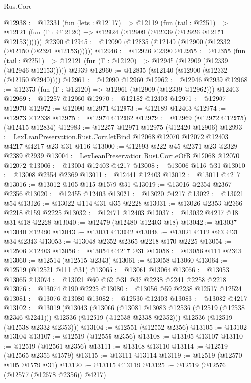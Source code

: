 \begin{lexlean}{RustCore}
\begin{coremodule}
@12938 := @12331
    (fun (lets : @12117) =>
    @12119
      (fun (tail : @2251) =>
      @12121 (fun (Γ : @12120) => @12924 (@12909 (@12339 (@12926 @12151 @12153))))))
    @2390
@12945 := @12090 (@12835 (@12140 (@12900 (@12332 (@12150 (@2391 @12153))))))
@12946 := @12926 @2390
@12955 := @12355
    (fun (tail : @2251) => @12121 (fun (Γ : @12120) => @12945 (@12909 (@12339 (@12946 @12153)))))
    @2939
@12960 := @12835 (@12140 (@12900 (@12332 (@12150 @2940))))
@12961 := @12090 @12960
@12962 := @12946 @2939
@12968 := @12373 (fun (Γ : @12120) => @12961 (@12909 (@12339 @12962))) @12403
@12969 := @12257 @12960
@12970 := @12182 @12403
@12971 := @12907 @12970
@12972 := @12090 @12971
@12973 := @12189 @12403
@12974 := @12973 @12338
@12975 := @12974 @12962
@12979 := @12969 (@12972 @12975) (@12415 @12834)
@12983 := @12257 @12971 @12975 (@12420 @12906)
@12993 := LexLeanPreservation.Rust.Corr.letBind @12068 @12070 @12072 @12403 @4217 @4217 @23 @31 @116
@13000 := @12993 @222 @45 @2371 @23 @2329 @2389 @2939
@13004 := LexLeanPreservation.Rust.Corr.eOfB @12068 @12070 @12072
@13006 := @13004 @12403 @4217
@13008 := @13006 @116 @31
@13010 := @13008 @2354 @2369
@13011 := @12441 @12403
@13012 := @13011 @4217
@13016 := @13012 @105 @115 @1579 @31
@13019 := @13016 @2354 @2367 @2356
@13020 := @12455 @12403
@13021 := @13020 @4217
@13022 := @13021 @54
@13026 := @13022 @114 @31 @35 @2228
@13031 := @13026 @2353 @2366 @2218 @159 @2225
@13032 := @12471 @12403
@13037 := @13032 @4217 @18 @31 @18 @2228
@13040 := @12479 (@12480 @12403 @18)
@13042 := @13037 @13040 @12490
@13043 := @13031 @13042
@13048 := @13021 @112 @63 @31 @34 @2343
@13053 := @13048 @2352 @2365 @2218 @170 @2225
@13054 := @12506 @12403
@13056 := @13054 @4217 @31
@13058 := @13056 @111 @2343
@13060 := @12514 (@12515 @2343)
@13061 := @13058 @13060
@13064 := @12519 (@12521 @111 @31)
@13065 := @13061 @13064
@13066 := @13053 @13065
@13074 := @13021 @60 @62 @31 @33 @2238 @2241 @2258 @2218
@13076 := @13074 @190 @2225
@13080 := @13056 @59 @2238 @12517 @12524
@13081 := @13076 @13080
@13082 := @12530 @12403
@13083 := @13082 @4217
@13102 := @13019
    (@13043
      (@13066
        (@13081 @13083 @12536 (@12519 (@12538 @2346 @2241)))
        @12536
        (@12519 (@12538 @2338 @2352)))
      @12536
      (@12519 (@12538 @2332 @2353)))
@13104 := @12551 (@12552 @2356)
@13105 := @13102 @13104
@13107 := @12519 (@12556 @2356)
@13108 := @13105 @13107
@13110 := @12519 (@12561 @2356)
@13111 := @13108 @13110
@13114 := @12519 (@12565 @2356 @1579)
@13115 := @13111 @13114
@13119 := @12519 (@12570 @105 @1579 @31)
@13120 := @13115 @13119
@13125 := @12519 (@12576 (@12577 (@12578 @2356)) @4217)

\end{coremodule}
\end{lexlean}
